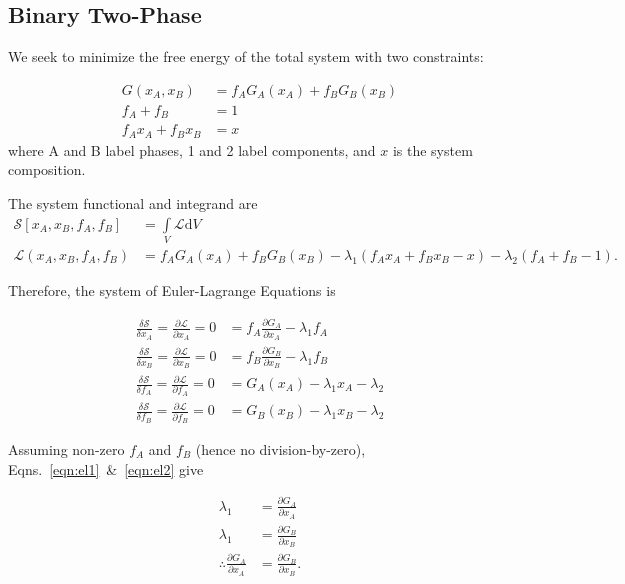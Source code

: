 \documentclass[10pt]{article}
\begin{document}
\subsection*{Binary Two-Phase}

We seek to minimize the free energy of the total system with two constraints:

\begin{align}
  G(x_A, x_B) &= f_A G_A(x_A) + f_B G_B(x_B)\\
  f_A + f_B &= 1\\
  f_A x_A + f_B x_B &= x
\end{align}
where A and B label phases, 1 and 2 label components, and $x$ is the system composition.

The system functional and integrand are
\begin{align}
  \mathcal{S}[x_A, x_B, f_A, f_B] &= \int\limits_V\mathcal{L}\mathrm{d}V\\
  \mathcal{L}(x_A, x_B, f_A, f_B) &= f_A G_A(x_A) + f_B G_B(x_B) - \lambda_1(f_A x_A + f_B x_B - x) - \lambda_2(f_A + f_B - 1).
\end{align}

Therefore, the system of Euler-Lagrange Equations is

\begin{align}
  \label{eqn:el1}
  \frac{\delta\mathcal{S}}{\delta x_A} = \frac{\partial\mathcal{L}}{\partial x_A} = 0 &= f_A \frac{\partial G_A}{\partial x_A} - \lambda_1 f_A\\
  \label{eqn:el2}
  \frac{\delta\mathcal{S}}{\delta x_B} = \frac{\partial\mathcal{L}}{\partial x_B} = 0 &= f_B \frac{\partial G_B}{\partial x_B} - \lambda_1 f_B\\
  \label{eqn:el3}
  \frac{\delta\mathcal{S}}{\delta f_A} = \frac{\partial\mathcal{L}}{\partial f_A} = 0 &= G_A(x_A) - \lambda_1x_A - \lambda_2\\
  \label{eqn:el4}
  \frac{\delta\mathcal{S}}{\delta f_B} = \frac{\partial\mathcal{L}}{\partial f_B} = 0 &= G_B(x_B) - \lambda_1x_B - \lambda_2
\end{align}

Assuming non-zero $f_A$ and $f_B$ (hence no division-by-zero), Eqns.~\ref{eqn:el1}~\&~\ref{eqn:el2} give

\begin{align}
  \lambda_1 &= \frac{\partial G_A}{\partial x_A}\\
  \lambda_1 &= \frac{\partial G_B}{\partial x_B}\\
  \label{eqn:chempot}
  \therefore \frac{\partial G_A}{\partial x_A} &= \frac{\partial G_B}{\partial x_B}.
\end{align}
\end{document}
